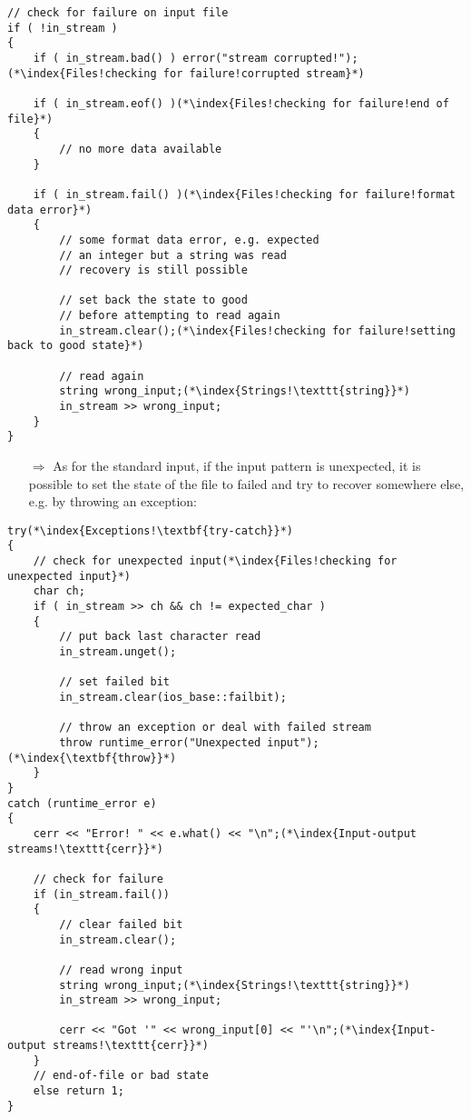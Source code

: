 \documentclass[10pt]{article}
\begin{document}
\begin{lstlisting}
// check for failure on input file
if ( !in_stream )
{
    if ( in_stream.bad() ) error("stream corrupted!");(*\index{Files!checking for failure!corrupted stream}*)
    
    if ( in_stream.eof() )(*\index{Files!checking for failure!end of file}*)
    { 
        // no more data available
    }
    
    if ( in_stream.fail() )(*\index{Files!checking for failure!format data error}*)
    {
        // some format data error, e.g. expected
        // an integer but a string was read
        // recovery is still possible
        
        // set back the state to good 
        // before attempting to read again
        in_stream.clear();(*\index{Files!checking for failure!setting back to good state}*)
        
        // read again
        string wrong_input;(*\index{Strings!\texttt{string}}*)
        in_stream >> wrong_input;
    }
}
\end{lstlisting}
\begin{enumerate}
\item[$\Rightarrow$] As for the standard input, if the input pattern is unexpected, it is possible to set the state of the file to failed
and try to recover somewhere else, e.g. by throwing an exception:
\end{enumerate}
\begin{lstlisting}
try(*\index{Exceptions!\textbf{try-catch}}*)
{
    // check for unexpected input(*\index{Files!checking for unexpected input}*)
    char ch;
    if ( in_stream >> ch && ch != expected_char )
    {
        // put back last character read
        in_stream.unget();
        
        // set failed bit
        in_stream.clear(ios_base::failbit);
    
        // throw an exception or deal with failed stream
        throw runtime_error("Unexpected input");(*\index{\textbf{throw}}*)
    }
}
catch (runtime_error e)
{
    cerr << "Error! " << e.what() << "\n";(*\index{Input-output streams!\texttt{cerr}}*)
            
    // check for failure
    if (in_stream.fail())
    {
        // clear failed bit
        in_stream.clear();
                
        // read wrong input
        string wrong_input;(*\index{Strings!\texttt{string}}*)
        in_stream >> wrong_input;
                    
        cerr << "Got '" << wrong_input[0] << "'\n";(*\index{Input-output streams!\texttt{cerr}}*)
    }
    // end-of-file or bad state
    else return 1;
}
\end{lstlisting}
\end{document}
